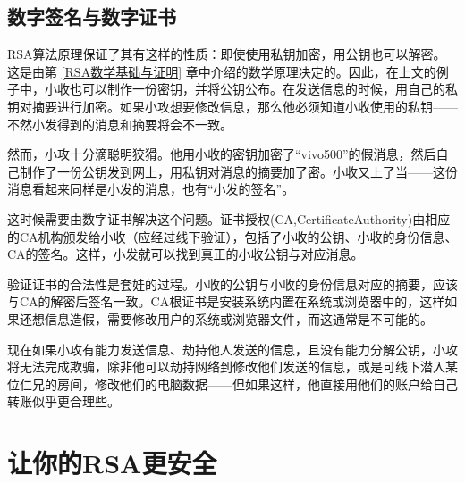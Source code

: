 \documentclass[a4paper]{article}         %
\begin{document}
\subsection{数字签名与数字证书}

RSA算法原理保证了其有这样的性质：即使使用私钥加密，用公钥也可以解密。这是由第 \ref{RSA数学基础与证明} 章中介绍的数学原理决定的。因此，在上文的例子中，小收也可以制作一份密钥，并将公钥公布。在发送信息的时候，用自己的私钥对摘要进行加密。如果小攻想要修改信息，那么他必须知道小收使用的私钥——不然小发得到的消息和摘要将会不一致。

然而，小攻十分滴聪明狡猾。他用小收的密钥加密了“vivo500”的假消息，然后自己制作了一份公钥发到网上，用私钥对消息的摘要加了密。小收又上了当——这份消息看起来同样是小发的消息，也有“小发的签名”。

这时候需要由数字证书解决这个问题。证书授权(CA,CertificateAuthority)由相应的CA机构颁发给小收（应经过线下验证），包括了小收的公钥、小收的身份信息、CA的签名。这样，小发就可以找到真正的小收公钥与对应消息。

验证证书的合法性是套娃的过程。小收的公钥与小收的身份信息对应的摘要，应该与CA的解密后签名一致。CA根证书是安装系统内置在系统或浏览器中的，这样如果还想信息造假，需要修改用户的系统或浏览器文件，而这通常是不可能的。

现在如果小攻有能力发送信息、劫持他人发送的信息，且没有能力分解公钥，小攻将无法完成欺骗，除非他可以劫持网络到修改他们发送的信息，或是可线下潜入某位仁兄的房间，修改他们的电脑数据——但如果这样，他直接用他们的账户给自己转账似乎更合理些。

\section{让你的RSA更安全}




\end{document}
